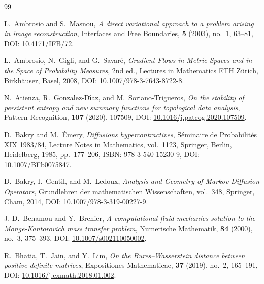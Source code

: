 \documentclass[11pt,a4paper,reqno]{amsart}
\theoremstyle{definition}
\numberwithin{equation}{section}
\begin{document}
\begin{thebibliography}{99}

L.~Ambrosio and S.~Masnou,
\emph{A direct variational approach to a problem arising in image reconstruction},
Interfaces and Free Boundaries, \textbf{5} (2003), no.~1, 63--81, DOI: \href{https://doi.org/10.4171/IFB/72}{10.4171/IFB/72}.

L.~Ambrosio, N.~Gigli, and G.~Savar{\'e},
\emph{Gradient Flows in Metric Spaces and in the Space of Probability Measures},
2nd ed., Lectures in Mathematics ETH Z{\"u}rich, Birkh{\"a}user, Basel, 2008, DOI: \href{https://doi.org/10.1007/978-3-7643-8722-8}{10.1007/978-3-7643-8722-8}.

N.~Atienza, R.~Gonzalez-D{\'\i}az, and M.~Soriano-Trigueros,
\emph{On the stability of persistent entropy and new summary functions for topological data analysis},
Pattern Recognition, \textbf{107} (2020), 107509, DOI: \href{https://doi.org/10.1016/j.patcog.2020.107509}{10.1016/j.patcog.2020.107509}.

D.~Bakry and M.~{\'E}mery,
\emph{Diffusions hypercontractives},
S{\'e}minaire de Probabilit{\'e}s XIX 1983/84, Lecture Notes in Mathematics, vol.~1123, Springer, Berlin, Heidelberg, 1985, pp.~177--206, ISBN: 978-3-540-15230-9, DOI: \href{https://doi.org/10.1007/BFb0075847}{10.1007/BFb0075847}.

D.~Bakry, I.~Gentil, and M.~Ledoux,
\emph{Analysis and Geometry of Markov Diffusion Operators},
Grundlehren der mathematischen Wissenschaften, vol.~348, Springer, Cham, 2014, DOI: \href{https://doi.org/10.1007/978-3-319-00227-9}{10.1007/978-3-319-00227-9}.

J.-D.~Benamou and Y.~Brenier,
\emph{A computational fluid mechanics solution to the Monge-Kantorovich mass transfer problem},
Numerische Mathematik, \textbf{84} (2000), no.~3, 375--393, DOI: \href{https://doi.org/10.1007/s002110050002}{10.1007/s002110050002}.

R.~Bhatia, T.~Jain, and Y.~Lim,
\emph{On the Bures--Wasserstein distance between positive definite matrices},
Expositiones Mathematicae, \textbf{37} (2019), no.~2, 165--191, DOI: \href{https://doi.org/10.1016/j.exmath.2018.01.002}{10.1016/j.exmath.2018.01.002}.


\end{thebibliography}
\end{document}
